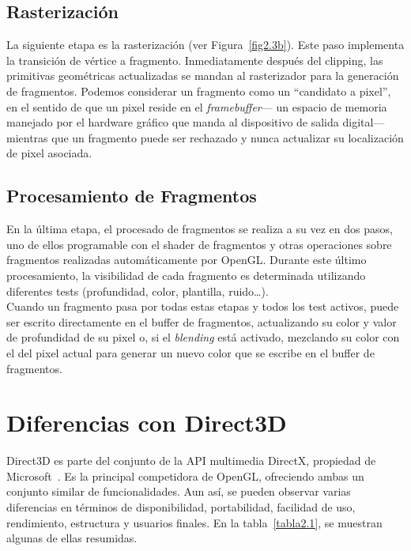 \subsection{Rasterización}
\label{ref:rasterizacion}

La siguiente etapa es la rasterización (ver Figura~\ref{fig2.3b}). Este paso
implementa la transición de vértice a fragmento. Inmediatamente después del
clipping, las primitivas geométricas actualizadas se mandan al rasterizador para
la generación de fragmentos. Podemos considerar un fragmento como un ``candidato
a pixel'', en el sentido de que un pixel reside en el \textit{framebuffer}--- un
espacio de memoria manejado por el hardware gráfico que manda al dispositivo de
salida digital--- mientras que un fragmento puede ser rechazado y nunca
actualizar su localización de pixel asociada. \\

\subsection{Procesamiento de Fragmentos}
\label{ref:procesamientofrags}

En la última etapa, el procesado de fragmentos se realiza a su vez en dos pasos,
uno de ellos programable con el shader de fragmentos y otras operaciones sobre
fragmentos realizadas automáticamente por OpenGL.  Durante este último
procesamiento, la visibilidad de cada fragmento es determinada utilizando
diferentes tests (profundidad, color, plantilla, ruido\ldots). \\

Cuando un fragmento pasa por todas estas etapas y todos los test activos, puede
ser escrito directamente en el buffer de fragmentos, actualizando su color y
valor de profundidad de su pixel o, si el \textit{blending} está activado,
mezclando su color con el del pixel actual para generar un nuevo color que se
escribe en el buffer de fragmentos.\\

\section{Diferencias con Direct3D}
\label{makereference2.4}

Direct3D es parte del conjunto de la API multimedia DirectX, propiedad de
Microsoft~\cite{Microsoft}. Es la principal competidora de OpenGL, ofreciendo
ambas un conjunto similar de funcionalidades. Aun así, se pueden observar varias
diferencias en términos de disponibilidad, portabilidad, facilidad de uso,
rendimiento, estructura y usuarios finales. En la tabla~\ref{tabla2.1}, se
muestran algunas de ellas resumidas.

